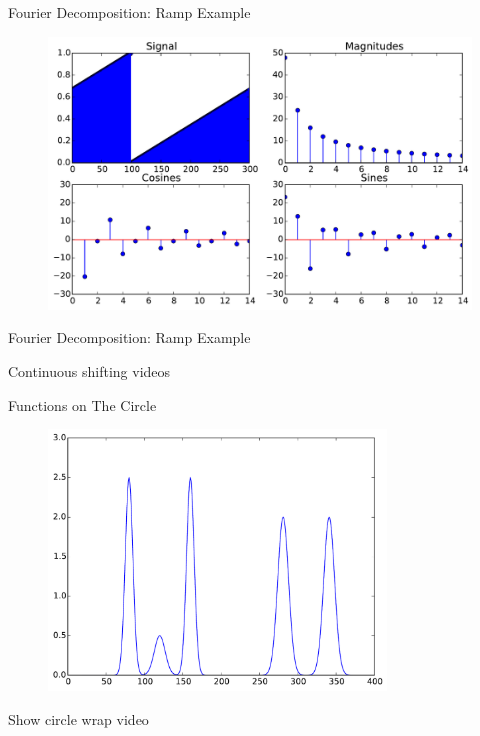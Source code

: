 \documentclass{beamer}
\begin{document}
\begin{frame}{Fourier Decomposition: Ramp Example}

\begin{figure}[t]
    \includegraphics[width=\textwidth]{Ramp3/SignalDecomposition.pdf}
\end{figure}

\end{frame}

\begin{frame}{Fourier Decomposition: Ramp Example}

Continuous shifting videos

\end{frame}


\begin{frame}{Functions on The Circle}

\begin{figure}
    \includegraphics[width=0.8\textwidth]{5Gaussians.pdf}
\end{figure}

Show circle wrap video

\end{frame}
\end{document}
